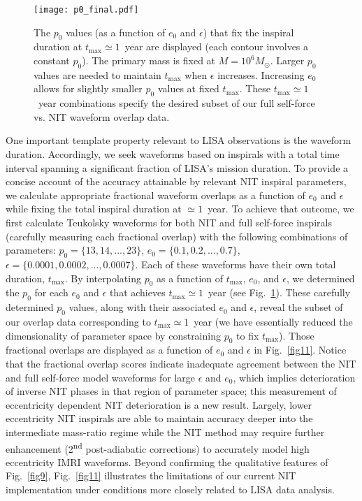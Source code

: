 \documentclass[aps,prd,twocolumn,showpacs,notitlepage,eqsecnum,
superscriptaddress,nofootinbib]{revtex4-1}
\begin{document}
\begin{figure}
\centering
  \vspace{0.2cm}
  \texttt{[image: p0\_final.pdf]} 
    \caption{The $p_0$ values (as a function of $e_0$ and $\epsilon$) that fix the inspiral duration at $t_\text{max}\simeq 1$~year are displayed (each contour involves a constant $p_0$). The primary mass is fixed at $M=10^6 M_\odot$. Larger $p_0$ values are needed to maintain $t_\text{max}$ when $\epsilon$ increases. Increasing $e_0$ allows for slightly smaller $p_0$ values at fixed $t_\text{max}$. These $t_\text{max}\simeq 1$~year combinations specify the desired subset of our full self-force vs. NIT waveform overlap data.}
  \label{fig10}
\end{figure}

One important template property relevant to LISA observations is the waveform duration. Accordingly, we seek waveforms based on inspirals with a total time interval spanning a significant fraction of LISA's mission duration. To provide a concise account of the accuracy attainable by relevant NIT inspiral parameters, we calculate appropriate fractional waveform overlaps as a function of $e_0$ and $\epsilon$ while fixing the total inspiral duration at $\simeq 1$~year. To achieve that outcome, we first calculate Teukolsky waveforms for both NIT and full self-force inspirals (carefully measuring each fractional overlap) with the following combinations of parameters: $p_0 = \{13,14,...,23\}$, $e_0 = \{0.1,0.2,...,0.7\}$, $\epsilon = \{0.0001,0.0002,...,0.0007\}$. Each of these waveforms have their own total duration, $t_\text{max}$. By interpolating $p_0$ as a function of $t_\text{max}$, $e_0$, and $\epsilon$, we determined the $p_0$ for each $e_0$ and $\epsilon$ that achieves $t_\text{max}\simeq 1$~year (see Fig.~\ref{fig10}). These carefully determined $p_0$ values, along with their associated $e_0$ and $\epsilon$, reveal the subset of our overlap data corresponding to $t_\text{max}\simeq 1$~year (we have essentially reduced the dimensionality of parameter space by constraining $p_0$ to fix $t_\text{max}$). Those fractional overlaps are displayed as a function of $e_0$ and $\epsilon$ in Fig.~\ref{fig11}. Notice that the fractional overlap scores indicate inadequate agreement between the NIT and full self-force model waveforms for large $\epsilon$ and $e_0$, which implies deterioration of inverse NIT phases in that region of parameter space; this measurement of eccentricity dependent NIT deterioration is a new result. Largely, lower eccentricity NIT inspirals are able to maintain accuracy deeper into the intermediate mass-ratio regime while the NIT method may require further enhancement (2\textsuperscript{nd} post-adiabatic corrections) to accurately model high eccentricity IMRI waveforms. Beyond confirming the qualitative features of Fig.~\ref{fig9}, Fig.~\ref{fig11} illustrates the limitations of our current NIT implementation under conditions more closely related to LISA data analysis.
\end{document}
